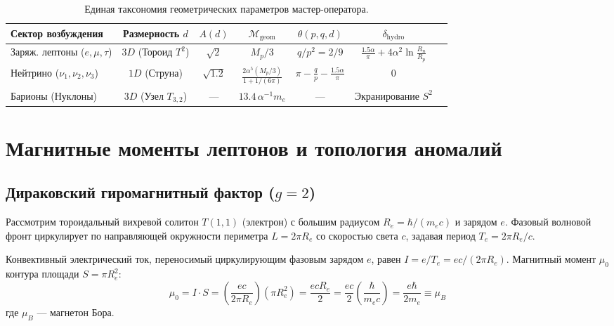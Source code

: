 \documentclass[12pt,a4paper]{article}
\begin{document}
	\begin{table}[h!]
		\centering
		\small
		\begin{tabular}{lcccccc}
			\toprule
			\textbf{Сектор возбуждения} & \textbf{Размерность $d$} & $A(d)$ & $\mathcal{M}_{\text{geom}}$ & $\theta(p,q,d)$ & $\delta_{\text{hydro}}$ \\
			\midrule
			Заряж. лептоны ($e,\mu,\tau$) & $3D$ (Тороид $T^2$) & $\sqrt{2}$ & $M_p/3$ & $q/p^2 = 2/9$ & $\frac{1.5\alpha}{\pi} + 4\alpha^2\ln\frac{R_n}{R_p}$ \\
			Нейтрино ($\nu_1,\nu_2,\nu_3$)     & $1D$ (Струна) & $\sqrt{1.2}$ & $\frac{2\alpha^5(M_p/3)}{1 + 1/(6\pi)}$ & $\pi - \frac{q}{p} - \frac{1.5\alpha}{\pi}$ & $0$ \\
			Барионы (Нуклоны)                 & $3D$ (Узел $T_{3,2}$) & --- & $13.4 \, \alpha^{-1} m_e$ & --- & Экранирование $S^2$ \\
			\bottomrule
		\end{tabular}
		\caption{Единая таксономия геометрических параметров мастер-оператора.}
	\end{table}
	
	\section{Магнитные моменты лептонов и топология аномалий}
	
	\subsection{Дираковский гиромагнитный фактор ($g=2$)}
	Рассмотрим тороидальный вихревой солитон $T(1,1)$ (электрон) с большим радиусом $R_e = \hbar / (m_e c)$ и зарядом $e$. Фазовый волновой фронт циркулирует по направляющей окружности периметра $L = 2\pi R_e$ со скоростью света $c$, задавая период $T_e = 2\pi R_e / c$.
	
	Конвективный электрический ток, переносимый циркулирующим фазовым зарядом $e$, равен $I = e / T_e = e c / (2\pi R_e)$. Магнитный момент $\mu_0$ контура площади $S = \pi R_e^2$:
	\begin{equation}
		\mu_0 = I \cdot S = \left( \frac{e c}{2\pi R_e} \right) \left( \pi R_e^2 \right) = \frac{e c R_e}{2} = \frac{e c}{2} \left( \frac{\hbar}{m_e c} \right) = \frac{e \hbar}{2 m_e} \equiv \mu_B
	\end{equation}
	где $\mu_B$ — магнетон Бора.
	
\end{document}
